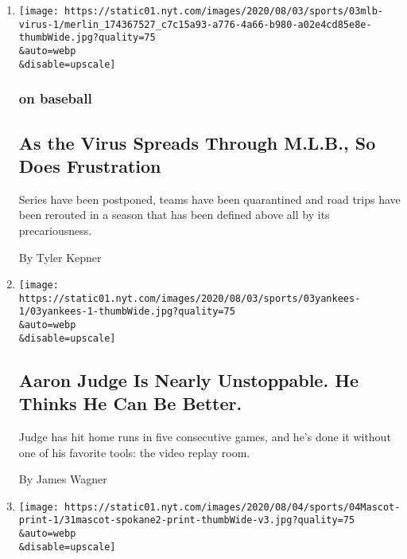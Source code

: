 \begin{enumerate}
\def\labelenumi{\arabic{enumi}.}
\item
  \href{/2020/08/03/sports/baseball/mlb-coronavirus-outbreak.html}{}

  \texttt{[image: https://static01.nyt.com/images/2020/08/03/sports/03mlb-virus-1/merlin\_174367527\_c7c15a93-a776-4a66-b980-a02e4cd85e8e-thumbWide.jpg?quality=75\\\&auto=webp\\\&disable=upscale]}

  \hypertarget{on-baseball}{%
  \subsubsection{on baseball}\label{on-baseball}}

  \hypertarget{as-the-virus-spreads-through-mlb-so-does-frustration}{%
  \subsection{As the Virus Spreads Through M.L.B., So Does
  Frustration}\label{as-the-virus-spreads-through-mlb-so-does-frustration}}

  Series have been postponed, teams have been quarantined and road trips
  have been rerouted in a season that has been defined above all by its
  precariousness.

  By Tyler Kepner
\item
  \href{/2020/08/03/sports/baseball/aaron-judge-yankees.html}{}

  \texttt{[image: https://static01.nyt.com/images/2020/08/03/sports/03yankees-1/03yankees-1-thumbWide.jpg?quality=75\\\&auto=webp\\\&disable=upscale]}

  \hypertarget{aaron-judge-is-nearly-unstoppable-he-thinks-he-can-be-better}{%
  \subsection{Aaron Judge Is Nearly Unstoppable. He Thinks He Can Be
  Better.}\label{aaron-judge-is-nearly-unstoppable-he-thinks-he-can-be-better}}

  Judge has hit home runs in five consecutive games, and he's done it
  without one of his favorite tools: the video replay room.

  By James Wagner
\item
  \href{/2020/08/03/sports/baseball/indians-team-names-mascots.html}{}

  \texttt{[image: https://static01.nyt.com/images/2020/08/04/sports/04Mascot-print-1/31mascot-spokane2-print-thumbWide-v3.jpg?quality=75\\\&auto=webp\\\&disable=upscale]}


\end{enumerate}
